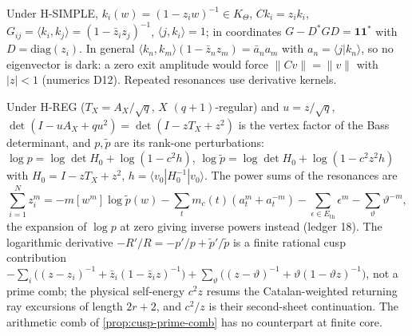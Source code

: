 \begin{lemma}
\label{lem:cusp-gram-exit}
Under H-SIMPLE, $k_i(w) = (1-z_iw)^{-1}\in K_\Theta$, $Ck_i = z_ik_i$, $G_{ij} = \langle k_i,k_j\rangle =
(1-\bar z_iz_j)^{-1}$, $\langle j,k_i\rangle = 1$; in coordinates $G - D^{*}GD = \mathbf 1\mathbf 1^{*}$
with $D = \mathrm{diag}(z_i)$. In general $\langle k_n,k_m\rangle(1-\bar z_nz_m) = \bar a_na_m$ with
$a_n = \langle j|k_n\rangle$, so no eigenvector is dark: a zero exit amplitude would force $\|Cv\| = \|v\|$
with $|z|<1$ (numerics D12). Repeated resonances use derivative kernels.
\end{lemma}

\begin{proposition}
\label{prop:cusp-walk-power-sums}
Under H-REG ($T_X = A_X/\sqrt q$, $X$ $(q+1)$-regular) and $u = z/\sqrt q$, $\det(I-uA_X+qu^2) = \det(I-zT_X+z^2)$
is the vertex factor of the Bass determinant, and $p,\tilde p$ are its rank-one perturbations:
$\log p = \log\det H_0 + \log(1-c^2h)$, $\log\tilde p = \log\det H_0+\log(1-c^2z^2h)$ with
$H_0 = I - zT_X+z^2$, $h = \langle v_0|H_0^{-1}|v_0\rangle$. The power sums of the resonances are
\[
\sum_{i=1}^N z_i^m = -m[w^m]\log\tilde p(w) - \sum_t m_c(t)(a_t^m+a_t^{-m}) - \sum_{\epsilon\in E_{\mathrm{th}}}\epsilon^m - \sum_\vartheta\vartheta^{-m},
\]
the expansion of $\log p$ at zero giving inverse powers instead (ledger 18). The logarithmic derivative
$-R'/R = -p'/p + \tilde p'/\tilde p$ is a finite rational cusp contribution
$-\sum_i\big((z-z_i)^{-1}+\bar z_i(1-\bar z_iz)^{-1}\big) + \sum_\vartheta\big((z-\vartheta)^{-1}+\vartheta(1-\vartheta z)^{-1}\big)$,
not a prime comb; the physical self-energy $c^2z$ resums the Catalan-weighted returning ray excursions of
length $2r+2$, and $c^2/z$ is their second-sheet continuation. The arithmetic comb of
\cref{prop:cusp-prime-comb} has no counterpart at finite core.
\end{proposition}

